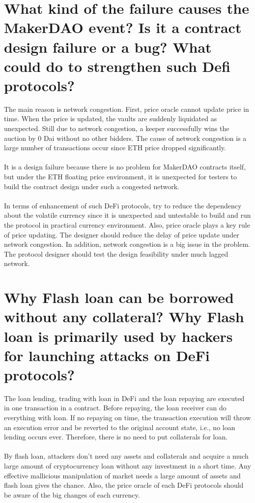 \documentclass{article}
\begin{document}
\section{What kind of the failure causes the MakerDAO event? Is it a contract design
failure or a bug? What could do to strengthen such Defi protocols?}
The main reason is network congestion. 
First, price oracle cannot update price in time. 
When the price is updated, the vaults are suddenly liquidated as unexpected. 
Still due to network congestion, a keeper successfully wins the auction by 0 Dai without no other bidders. 
The cause of network congestion is a large number of transactions occur since ETH price dropped significantly.\\\\
It is a design failure because there is no problem for MakerDAO contracts itself,
but under the ETH floating price environment, 
it is unexpected for testers to build the contract design under such a congested network.\\\\
In terms of enhancement of such DeFi protocols, try to reduce the dependency about the volatile currency
since it is unexpected and untestable to build and run the protocol in practical currency environment.
Also, price oracle plays a key rule of price updating. The designer should reduce the delay of price update under network congestion. In addition, network congestion is a big issue in the problem. The protocol designer should test the design feasibility under much lagged network.
\section{Why Flash loan can be borrowed without any collateral? Why Flash loan is
primarily used by hackers for launching attacks on DeFi protocols?}
The loan lending, trading with loan in DeFi 
and the loan repaying are executed in one transaction in a contract.
Before repaying, the loan receiver can do everything with loan. 
If no repaying on time, the transaction execution will throw an execution error and be reverted to the original account state,
i.e., no loan lending occurs ever. Therefore, there is no need to put collaterals for loan.\\\\
By flash loan, attackers don't need any assets and collaterals and acquire a much large amount of
cryptocurrency loan without any investment in a short time. 
Any effective mallicious manipulation of market needs a large amount of assets 
and flash loan gives the chance. 
Also, the price oracle of each DeFi protocols should be aware of the big changes of each currency.
\end{document}
